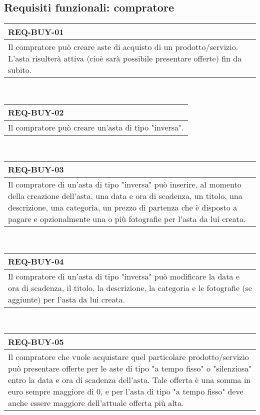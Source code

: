         \subsection{Requisiti funzionali: compratore}
        \begin{tabular}{|p{}|}
            \hline
            \multicolumn{1}{|l|}{\cellcolor{head}\textbf{REQ-BUY-01}} \\
            \hline
            Il compratore può creare aste di acquisto di un prodotto/servizio. L'asta risulterà attiva (cioè sarà possibile presentare offerte) fin da subito. \\
            \hline
        \end{tabular} \smallskip \\
        \begin{tabular}{|p{}|}
            \hline
            \multicolumn{1}{|l|}{\cellcolor{head}\textbf{REQ-BUY-02}} \\
            \hline
            Il compratore può creare un'asta di tipo "inversa". \\
            \hline
        \end{tabular} \smallskip \\
        \begin{tabular}{|p{}|}
            \hline
            \multicolumn{1}{|l|}{\cellcolor{head}\textbf{REQ-BUY-03}} \\
            \hline
            Il compratore di un'asta di tipo "inversa" può inserire, al momento della creazione dell'asta, una data e ora di scadenza, un titolo, una descrizione, una categoria, un prezzo di partenza che è disposto a pagare e opzionalmente una o più fotografie per l'asta da lui creata. \\
            \hline
        \end{tabular} \smallskip \\
        \begin{tabular}{|p{}|}
            \hline
            \multicolumn{1}{|l|}{\cellcolor{head}\textbf{REQ-BUY-04}} \\
            \hline
            Il compratore di un'asta di tipo "inversa" può modificare la data e ora di scadenza, il titolo, la descrizione, la categoria e le fotografie (se aggiunte) per l'asta da lui creata. \\
            \hline
        \end{tabular} \smallskip \\
        \begin{tabular}{|p{}|}
            \hline
            \multicolumn{1}{|l|}{\cellcolor{head}\textbf{REQ-BUY-05}} \\
            \hline
            Il compratore che vuole acquistare quel particolare prodotto/servizio può presentare offerte per le aste di tipo "a tempo fisso" o "silenziosa" entro la data e ora di scadenza dell'asta. Tale offerta è una somma in euro sempre maggiore di 0, e per l'asta di tipo "a tempo fisso" deve anche essere maggiore dell'attuale offerta più alta.  \\
            \hline
        \end{tabular} \smallskip \\
